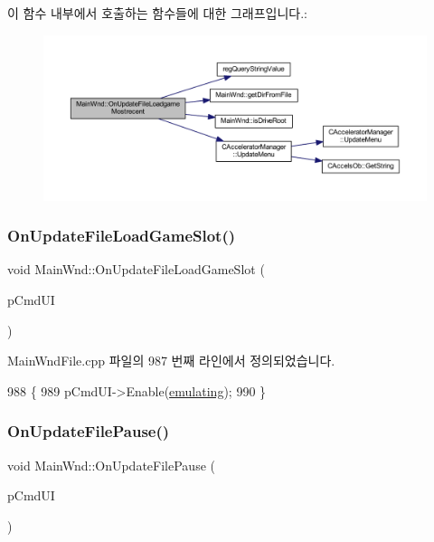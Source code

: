 이 함수 내부에서 호출하는 함수들에 대한 그래프입니다.\+:
\nopagebreak
\begin{figure}[H]
\begin{center}
\leavevmode
\includegraphics[width=350pt]{class_main_wnd_ae97e51d61f89103a934b4f55ed09c4d9_cgraph}
\end{center}
\end{figure}
\mbox{\label{class_main_wnd_a3b43dc9ab5ebe806a89d50eca3820369}} 
\subsubsection{\texorpdfstring{On\+Update\+File\+Load\+Game\+Slot()}{OnUpdateFileLoadGameSlot()}}
{\footnotesize\ttfamily void Main\+Wnd\+::\+On\+Update\+File\+Load\+Game\+Slot (\begin{DoxyParamCaption}\item[{C\+Cmd\+UI $\ast$}]{p\+Cmd\+UI }\end{DoxyParamCaption})}



Main\+Wnd\+File.\+cpp 파일의 987 번째 라인에서 정의되었습니다.


\begin{DoxyCode}
988 \{
989   pCmdUI->Enable(\mbox{\hyperlink{_main_wnd_file_8cpp_af9cc36078b1b311753963297ae7f2a74}{emulating}});
990 \}
\end{DoxyCode}
\mbox{\label{class_main_wnd_a408711da9dc428b4bf0d7335089a4482}} 
\subsubsection{\texorpdfstring{On\+Update\+File\+Pause()}{OnUpdateFilePause()}}
{\footnotesize\ttfamily void Main\+Wnd\+::\+On\+Update\+File\+Pause (\begin{DoxyParamCaption}\item[{C\+Cmd\+UI $\ast$}]{p\+Cmd\+UI }\end{DoxyParamCaption})\hspace{0.3cm}{\ttfamily [protected]}}



